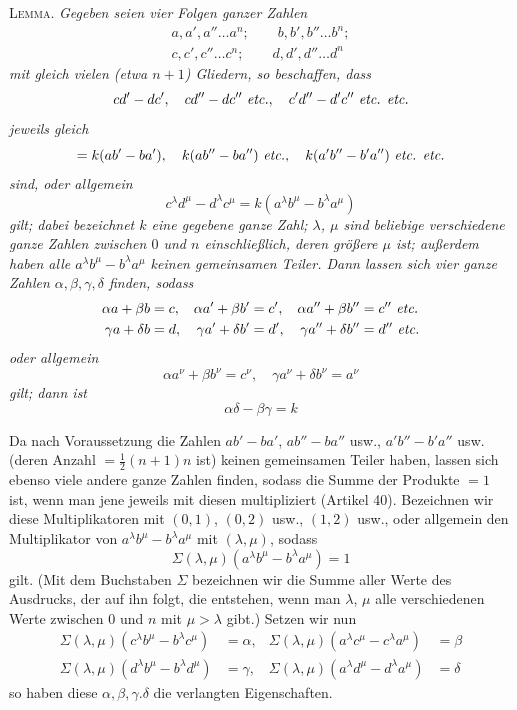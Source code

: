 \textsc{Lemma.} \textit{Gegeben seien vier Folgen ganzer Zahlen}
\[
\begin{gathered}a,a',a''\ldots a^n;\qquad b,b',b''\ldots b^n;\\c,c',c''\ldots c^n;\qquad d,d',d''\ldots d^n\end{gathered}
\]
\textit{mit gleich vielen (etwa $n+1$) Gliedern, so beschaffen, dass}
\[
cd'-dc',\quad cd''-dc''\ \text{\textit{etc.}},\quad c'd''-d'c''\ \text{\textit{etc. etc.}}
\]
\textit{jeweils gleich}
\[
=k(ab'-ba'),\quad k(ab''-ba'')\ \text{\textit{etc.}},\quad k(a'b''-b'a'')\ \text{\textit{etc. etc.}}
\]
\textit{sind, oder allgemein}
\[
c^\lambda d^\mu-d^\lambda c^\mu=k(a^\lambda b^\mu-b^\lambda a^\mu)
\]
\textit{gilt; dabei bezeichnet $k$ eine gegebene ganze Zahl; $\lambda$, $\mu$ sind beliebige verschiedene ganze Zahlen zwischen $0$ und $n$ einschließlich, deren größere $\mu$ ist}\textit{; außerdem haben alle $a^\lambda b^\mu-b^\lambda a^\mu$ keinen gemeinsamen Teiler. Dann lassen sich vier ganze Zahlen $\alpha,\beta,\gamma,\delta$ finden, sodass}
\[
\begin{aligned}
\alpha a+\beta b&=c, &\alpha a'+\beta b'&=c', &\alpha a''+\beta b''&=c''\ \text{\textit{etc.}}\\
\gamma a+\delta b&=d, &\gamma a'+\delta b'&=d', &\gamma a''+\delta b''&=d''\ \text{\textit{etc.}}
\end{aligned}
\]
\textit{oder allgemein}
\[
\alpha a^\nu+\beta b^\nu=c^\nu,\quad\gamma a^\nu+\delta b^\nu=a^\nu
\]
\textit{gilt; dann ist}
\[
\alpha\delta-\beta\gamma=k
\]

Da nach Voraussetzung die Zahlen $ab'-ba'$, $ab''-ba''$ usw., $a'b''-b'a''$ usw. (deren Anzahl $=\frac12(n+1)n$ ist) keinen gemeinsamen Teiler haben, lassen sich ebenso viele andere ganze Zahlen finden, sodass die Summe der Produkte $=1$ ist, wenn man jene jeweils mit diesen multipliziert (Artikel 40). Bezeichnen wir diese Multiplikatoren mit $(0,1)$, $(0,2)$ usw., $(1,2)$ usw., oder allgemein den Multiplikator von $a^\lambda b^\mu-b^\lambda a^\mu$ mit $(\lambda,\mu)$, sodass
\[
\Sigma(\lambda,\mu)(a^\lambda b^\mu-b^\lambda a^\mu)=1
\]
gilt. (Mit dem Buchstaben $\Sigma$ bezeichnen wir die Summe aller Werte des Ausdrucks, der auf ihn
folgt, die entstehen, wenn man $\lambda$, $\mu$ alle verschiedenen Werte zwischen $0$ und $n$ mit $\mu>\lambda$ gibt.) Setzen wir nun
\[
\begin{aligned}
\Sigma(\lambda,\mu)(c^\lambda b^\mu-b^\lambda c^\mu)&=\alpha, &\Sigma(\lambda,\mu)(a^\lambda c^\mu-c^\lambda a^\mu)&=\beta\\
\Sigma(\lambda,\mu)(d^\lambda b^\mu-b^\lambda d^\mu)&=\gamma, &\Sigma(\lambda,\mu)(a^\lambda d^\mu-d^\lambda a^\mu)&=\delta
\end{aligned}
\]
so haben diese $\alpha,\beta,\gamma.\delta$ die verlangten Eigenschaften.


